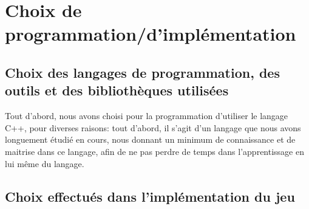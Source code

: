 \section{Choix de programmation/d'implémentation}



\pagebreak
\subsection{Choix des langages de programmation, des outils et des bibliothèques utilisées}
Tout d'abord, nous avons choisi pour la programmation d'utiliser le langage C++, pour diverses raisons: tout d'abord, il s'agit d'un langage que nous avons longuement étudié en cours, nous donnant un minimum de connaissance et de maitrise dans ce langage, afin de ne pas perdre de temps dans l'apprentissage en lui même du langage.






\newpage
\subsection{Choix effectués dans l'implémentation du jeu}

